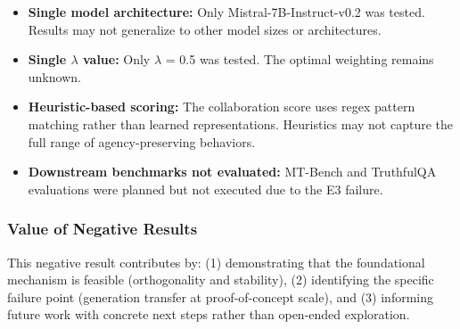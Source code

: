 \begin{itemize}
\item \textbf{Single model architecture:} Only Mistral-7B-Instruct-v0.2 was tested. Results may not generalize to other model sizes or architectures.
\end{itemize}

\begin{itemize}
\item \textbf{Single $\lambda$ value:} Only $\lambda$ = 0.5 was tested. The optimal weighting remains unknown.
\end{itemize}

\begin{itemize}
\item \textbf{Heuristic-based scoring:} The collaboration score uses regex pattern matching rather than learned representations. Heuristics may not capture the full range of agency-preserving behaviors.
\end{itemize}

\begin{itemize}
\item \textbf{Downstream benchmarks not evaluated:} MT-Bench and TruthfulQA evaluations were planned but not executed due to the E3 failure.
\end{itemize}

\subsubsection{Value of Negative Results}

This negative result contributes by: (1) demonstrating that the foundational mechanism is feasible (orthogonality and stability), (2) identifying the specific failure point (generation transfer at proof-of-concept scale), and (3) informing future work with concrete next steps rather than open-ended exploration.

